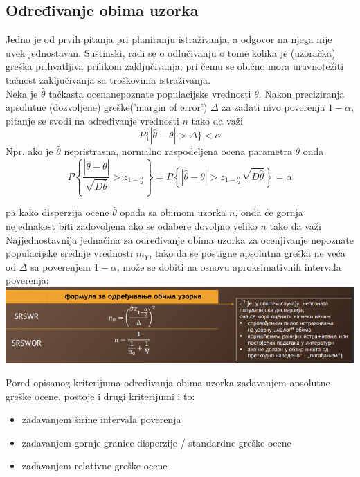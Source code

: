 \documentclass[10pt,a4paper,]{article}
\begin{document}
\subsection{Određivanje obima uzorka}
Jedno je od prvih pitanja pri planiranju istraživanja, a odgovor na njega nije uvek 
jednostavan. Suštinski, radi se o odlučivanju o tome kolika je (uzoračka) greška 
prihvatljiva prilikom zaključivanja, pri čemu se obično mora uravnotežiti tačnost 
zaključivanja sa troškovima istraživanja.
\\
Neka je $\hat{\theta}$ tačkasta ocenanepoznate populacijske vrednosti $\theta$. 
Nakon preciziranja apsolutne 
(dozvoljene) greške('margin of error') $\Delta$ za 
zadati nivo poverenja $1-\alpha$, pitanje se svodi na 
određivanje vrednosti $n$ tako da važi
$$ P \{ |\hat{\theta} - \theta| > \Delta \} < \alpha $$
Npr. ako je $\hat{\theta}$
nepristrasna, normalno raspodeljena ocena parametra $\theta$ onda 
$$P\left\{\frac{|\hat{\theta} - \theta|}{\sqrt{D\hat{\theta}}}
	> z_{1-\frac{\alpha}{2}}\right\} 
	= P \left\{|\hat{\theta} - \theta| > 
	z_{1-\frac{\alpha}{2}}\sqrt{D\hat{\theta}}\right\}
	= \alpha
$$

pa kako disperzija ocene $\hat{\theta}$ opada sa obimom uzorka $n$, 
onda će gornja nejednakost biti 
zadovoljena ako se odabere dovoljno veliko $n$ tako da važi 
\\[0.15cm]

Najjednostavnija jednačina za određivanje obima uzorka za ocenjivanje nepoznate 
populacijske srednje vrednosti $m_Y$, tako da se postigne apsolutna greška 
ne veća od $\Delta$ sa 
poverenjem $1-\alpha$, može se dobiti na osnovu aproksimativnih intervala poverenja:
\\
\includegraphics[scale=0.5]{primer12.png}

Pored opisanog kriterijuma određivanja obima uzorka zadavanjem apsolutne greške ocene, 
postoje i drugi kriterijumi i to:
\begin{itemize}
\item zadavanjem širine intervala poverenja
\item zadavanjem gornje granice disperzije / standardne greške ocene
\item zadavanjem relativne greške ocene
\end{itemize}
\end{document}
